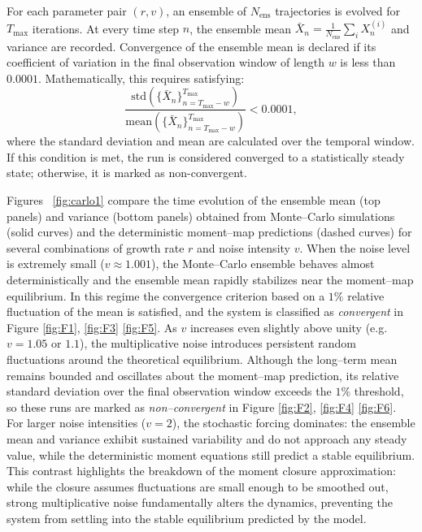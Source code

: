 \documentclass[12pt]{article}
\theoremstyle{definition}
\begin{document}
For each parameter pair $(r,v)$, an ensemble of $N_{\mathrm{ens}}$ trajectories is evolved for $T_{\max}$ iterations. At every time step $n$, the ensemble mean $\bar{X}_n = \frac{1}{N_{\mathrm{ens}}}\sum_i X_n^{(i)}$ and variance are recorded. Convergence of the ensemble mean is declared if its coefficient of variation in the final observation window of length $w$ is less than $0.0001$. Mathematically, this requires satisfying:
\begin{equation}
\frac{\mathrm{std}\left(\{\bar{X}_n\}_{n=T_{\max}-w}^{T_{\max}}\right)}
     {\mathrm{mean}\left(\{\bar{X}_n\}_{n=T_{\max}-w}^{T_{\max}}\right)} < 0.0001,
\end{equation}
where the standard deviation and mean are calculated over the temporal window. If this condition is met, the run is considered converged to a statistically steady state; otherwise, it is marked as non-convergent.


Figures~ \ref{fig:carlo1} compare the time evolution of the ensemble mean (top panels) 
and variance (bottom panels) obtained from Monte--Carlo simulations (solid curves) 
and the deterministic moment--map predictions (dashed curves) for several combinations 
of growth rate \(r\) and noise intensity \(v\).
When the noise level is extremely small (\(v\approx1.001\)), the Monte--Carlo ensemble behaves 
almost deterministically and the ensemble mean rapidly stabilizes near the 
moment--map equilibrium. 
In this regime the convergence criterion based on a $1\%$ relative fluctuation of the mean 
is satisfied, and the system is classified as \emph{convergent} in Figure \ref{fig:F1}, \ref{fig:F3}  \ref{fig:F5}.
As \(v\) increases even slightly above unity (e.g.\ \(v=1.05\) or \(1.1\)), the multiplicative noise 
introduces persistent random fluctuations around the theoretical equilibrium. 
Although the long--term mean remains bounded and oscillates about the 
moment--map prediction, its relative standard deviation over the final observation window 
exceeds the $1\%$ threshold, so these runs are marked as \emph{non--convergent} in Figure \ref{fig:F2}, \ref{fig:F4}  \ref{fig:F6}.
For larger noise intensities (\(v=2\)), the stochastic forcing dominates: 
the ensemble mean and variance exhibit sustained variability and do not approach any 
steady value, while the deterministic moment equations still predict a stable equilibrium. 
This contrast highlights the breakdown of the moment closure approximation: while the closure assumes fluctuations are small enough to be smoothed out, strong multiplicative noise fundamentally alters the dynamics, preventing the system from settling into the stable equilibrium predicted by the model.
\end{document}
